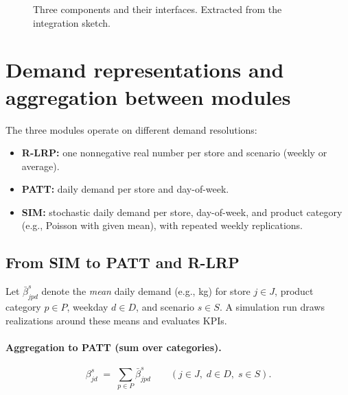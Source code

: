 \documentclass[11pt,a4paper]{article}
\begin{document}
\begin{figure}[t]
\caption{Three components and their interfaces. Extracted from the integration sketch.}
\label{fig:threeblocks}
\end{figure}

\section{Demand representations and aggregation between modules}

The three modules operate on different demand resolutions:
\begin{itemize}[leftmargin=1.4em]
\item \textbf{R-LRP:} one nonnegative real number per store and scenario (weekly or average).
\item \textbf{PATT:} daily demand per store and day-of-week.
\item \textbf{SIM:} stochastic daily demand per store, day-of-week, and product category (e.g., Poisson with given mean),
with repeated weekly replications.
\end{itemize}

\subsection{From SIM to PATT and R-LRP}

Let $\bar\beta^{s}_{jpd}$ denote the \emph{mean} daily demand (e.g., kg) for store $j\in J$,
product category $p\in P$, weekday $d\in D$, and scenario $s\in S$.
A simulation run draws realizations around these means and evaluates KPIs.

\paragraph{Aggregation to PATT (sum over categories).}
\begin{equation}
  \beta^{s}_{jd} \;=\; \sum_{p\in P} \bar\beta^{s}_{jpd}
  \qquad (j\in J,\; d\in D,\; s\in S).
  \label{eq:sim-to-patt}
\end{equation}
\end{document}
